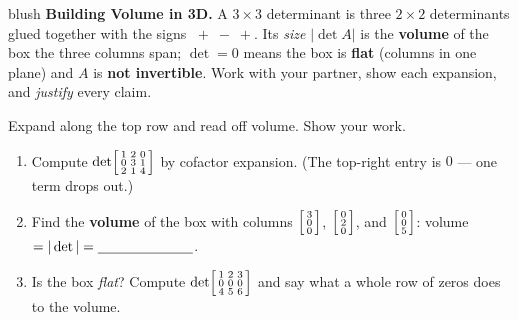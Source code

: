 \documentclass[10pt]{article}
\begin{document}
\namepartnerperiod

\vspace{0.10in}

\begin{headlinebox}{blush}
\small\textbf{Building Volume in 3D.} A $3\times3$ determinant is three $2\times2$ determinants glued
together with the signs $\;{+}\;{-}\;{+}$. Its \emph{size} $|\det A|$ is the \textbf{volume} of the box
the three columns span; $\det=0$ means the box is \textbf{flat} (columns in one plane) and $A$ is
\textbf{not invertible}. Work with your partner, show each expansion, and \emph{justify} every claim.
\end{headlinebox}

\vspace{0.10in}

\begin{tcolorbox}[colback=white, colframe=black!40, title=\textbf{Tier R --- Remediate},
    fonttitle=\bfseries, arc=1.5mm, left=3mm, right=3mm, top=2mm, bottom=2mm, breakable]
Expand along the top row and read off volume. Show your work.
\begin{enumerate}[leftmargin=1.7em, itemsep=9pt]
  \item Compute $\det\begin{bsmallmatrix} 1 & 2 & 0 \\ 0 & 3 & 1 \\ 2 & 1 & 4 \end{bsmallmatrix}$ by
        cofactor expansion. \; (The top-right entry is $0$ --- one term drops out.) 
  \item Find the \textbf{volume} of the box with columns
        $\begin{bsmallmatrix} 3\\0\\0 \end{bsmallmatrix}$, $\begin{bsmallmatrix} 0\\2\\0 \end{bsmallmatrix}$, and $\begin{bsmallmatrix} 0\\0\\5 \end{bsmallmatrix}$:
        \quad volume $=|\det| = \blank{2.4cm}$.
  \item Is the box \emph{flat}? Compute $\det\begin{bsmallmatrix} 1 & 2 & 3 \\ 0 & 0 & 0 \\ 4 & 5 & 6 \end{bsmallmatrix}$
        and say what a whole row of zeros does to the volume. \; \blank{3.0cm}
\end{enumerate}
\end{tcolorbox}
\end{document}
